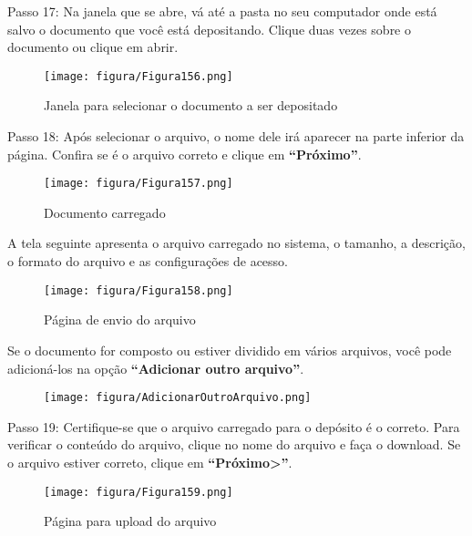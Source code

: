 \documentclass[12pt,hidelinks]{article}
\begin{document}
    Passo 17: Na janela que se abre, vá até a pasta no seu computador onde está salvo o documento que você está depositando. Clique duas vezes sobre o documento ou clique em abrir.
    
    \begin{figure}[!htp]
                \centering
                \texttt{[image: figura/Figura156.png]}
                \caption{Janela para selecionar o documento a ser depositado}
            \label{Rotulo}
        \end{figure}

\newpage

    Passo 18: Após selecionar o arquivo, o nome dele irá aparecer na parte inferior da página. Confira se é o arquivo correto e clique em \textbf{“Próximo”}.
    
    \begin{figure}[!htp]
                \centering
                \texttt{[image: figura/Figura157.png]}
                \caption{Documento carregado}
            \label{Rotulo}
        \end{figure}
    
    A tela seguinte apresenta o arquivo carregado no sistema, o tamanho, a descrição, o formato do arquivo e as configurações de acesso.
    
    \begin{figure}[!htp]
                \centering
                \texttt{[image: figura/Figura158.png]}
                \caption{Página de envio do arquivo}
            \label{Rotulo}
        \end{figure}

\newpage
    
    Se o documento for composto ou estiver dividido em vários arquivos, você pode adicioná-los na opção \textbf{“Adicionar outro arquivo”}.
    
    \begin{figure}[!htp]
                \centering
                \texttt{[image: figura/AdicionarOutroArquivo.png]}
            \label{Rotulo}
        \end{figure}
    
    Passo 19: Certifique-se que o arquivo carregado para o depósito é o correto. Para verificar o conteúdo do arquivo, clique no nome do arquivo e faça o download. Se o arquivo estiver correto, clique em \textbf{“Próximo>”}.
    
    \begin{figure}[!htp]
                \centering
                \texttt{[image: figura/Figura159.png]}
                \caption{Página para upload do arquivo}
            \label{Rotulo}
        \end{figure}
    
\end{document}
